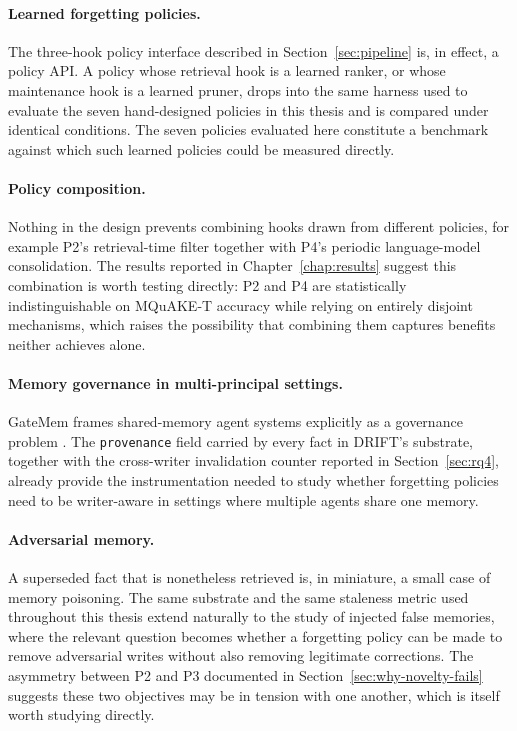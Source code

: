 \paragraph{Learned forgetting policies.} The three-hook policy interface described in Section~\ref{sec:pipeline} is, in effect, a policy API. A policy whose retrieval hook is a learned ranker, or whose maintenance hook is a learned pruner, drops into the same harness used to evaluate the seven hand-designed policies in this thesis and is compared under identical conditions. The seven policies evaluated here constitute a benchmark against which such learned policies could be measured directly.

\paragraph{Policy composition.} Nothing in the design prevents combining hooks drawn from different policies, for example P2's retrieval-time filter together with P4's periodic language-model consolidation. The results reported in Chapter~\ref{chap:results} suggest this combination is worth testing directly: P2 and P4 are statistically indistinguishable on MQuAKE-T accuracy while relying on entirely disjoint mechanisms, which raises the possibility that combining them captures benefits neither achieves alone.

\paragraph{Memory governance in multi-principal settings.} GateMem frames shared-memory agent systems explicitly as a governance problem \citep{ren2026gatemem}. The \texttt{provenance} field carried by every fact in DRIFT's substrate, together with the cross-writer invalidation counter reported in Section~\ref{sec:rq4}, already provide the instrumentation needed to study whether forgetting policies need to be writer-aware in settings where multiple agents share one memory.

\paragraph{Adversarial memory.} A superseded fact that is nonetheless retrieved is, in miniature, a small case of memory poisoning. The same substrate and the same staleness metric used throughout this thesis extend naturally to the study of injected false memories, where the relevant question becomes whether a forgetting policy can be made to remove adversarial writes without also removing legitimate corrections. The asymmetry between P2 and P3 documented in Section~\ref{sec:why-novelty-fails} suggests these two objectives may be in tension with one another, which is itself worth studying directly.

